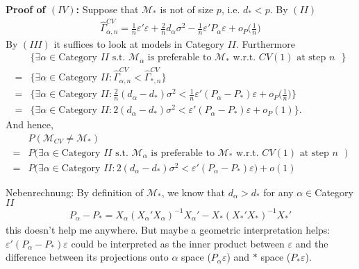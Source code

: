 \documentclass[Research_Module_ES.tex]{subfiles}
\begin{document}
\textbf{Proof of $(IV)$:}
Suppose that $\mathcal{M}_\ast$ is not of size $p$, i.e. $d_\ast < p$.
By $(II)$ 
\begin{align*}
\hat{\Gamma}_{\alpha,n}^{CV} = \frac{1}{n}\varepsilon'\varepsilon + \frac{2}{n}d_\alpha\sigma^2 - \frac{1}{n}\varepsilon'P_\alpha\varepsilon + o_P\biggl(\frac{1}{n}\biggr)
\end{align*}
By $(III)$ it suffices to look at models in Category $II$.
Furthermore 
\begin{align*}
&\{ \exists\alpha\in \textrm{Category $II$} \textrm{ s.t. $\mathcal{M}_\alpha$ is preferable to $\mathcal{M}_\ast$ w.r.t. $CV(1)$ at step $n$ }\} \\
= &\{ \exists\alpha\in \textrm{Category $II$}: \hat{\Gamma}_{\alpha,n}^{CV} < \hat{\Gamma}_{\ast,n}^{CV} \} \\
= &\biggl\{ \exists\alpha\in \textrm{Category $II$}: \frac{2}{n}(d_\alpha-d_\ast)\sigma^2 < \frac{1}{n}\varepsilon'(P_\alpha-P_\ast)\varepsilon + o_P\biggl(\frac{1}{n}\biggr) \biggr\}\\
= &\{ \exists\alpha\in \textrm{Category $II$}: 2(d_\alpha-d_\ast)\sigma^2 <\varepsilon'(P_\alpha-P_\ast)\varepsilon + o_P(1) \}.
\end{align*}
And hence, 
\begin{align*}
&P(\mathcal{M}_{CV}\neq \mathcal{M}_\ast) \\
= &P\bigl(\exists\alpha\in \textrm{Category $II$} \textrm{ s.t. $\mathcal{M}_\alpha$ is preferable to $\mathcal{M}_\ast$ w.r.t. $CV(1)$ at step $n$ }\bigr)\\
= &P\bigl(\exists\alpha\in \textrm{Category $II$}: 2(d_\alpha-d_\ast)\sigma^2 <\varepsilon'(P_\alpha-P_\ast)\varepsilon\bigr) + o(1)
\end{align*}

Nebenrechnung:
By definition of $\mathcal{M}_\ast$, we know that $d_\alpha > d_\ast$ for any $\alpha \in $Category $II$
\begin{align*}
P_\alpha-P_\ast = X_\alpha(X_\alpha'X_\alpha)^{-1}X_\alpha' - X_\ast (X_\ast'X_\ast)^{-1} X_\ast'
\end{align*}
this doesn't help me anywhere. 
But maybe a geometric interpretation helps:
$\varepsilon'(P_\alpha-P_\ast) \varepsilon$
could be interpreted as the inner product between $\varepsilon$ and the difference between its projections onto $\alpha$ space  ($P_\alpha\varepsilon$) and $\ast$ space ($P_\ast\varepsilon$).
\end{document}
